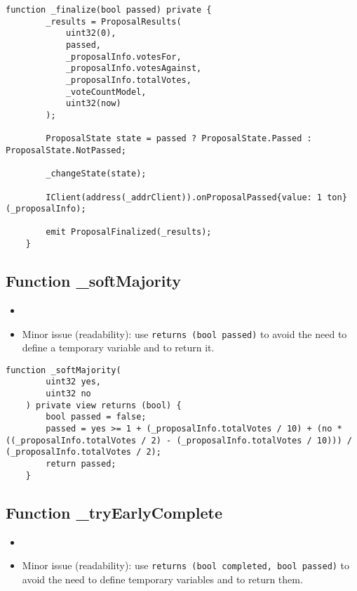 \begin{lstlisting}[firstnumber=81]
    function _finalize(bool passed) private {
        _results = ProposalResults(
            uint32(0),
            passed,
            _proposalInfo.votesFor,
            _proposalInfo.votesAgainst,
            _proposalInfo.totalVotes,
            _voteCountModel,
            uint32(now)
        );

        ProposalState state = passed ? ProposalState.Passed : ProposalState.NotPassed;

        _changeState(state);

        IClient(address(_addrClient)).onProposalPassed{value: 1 ton} (_proposalInfo);

        emit ProposalFinalized(_results);
    }
\end{lstlisting}

\subsection{Function \_{}softMajority}

\begin{itemize}
\item {}
\item Minor issue (readability): use {\tt returns (bool passed)} to
  avoid the need to define a temporary variable and to return it.
\end{itemize}

\begin{lstlisting}[firstnumber=141]
    function _softMajority(
        uint32 yes,
        uint32 no
    ) private view returns (bool) {
        bool passed = false;
        passed = yes >= 1 + (_proposalInfo.totalVotes / 10) + (no * ((_proposalInfo.totalVotes / 2) - (_proposalInfo.totalVotes / 10))) / (_proposalInfo.totalVotes / 2);
        return passed;
    }
\end{lstlisting}

\subsection{Function \_{}tryEarlyComplete}

\begin{itemize}
\item {}
\item Minor issue (readability): use {\tt returns (bool completed,
  bool passed)} to avoid the need to define temporary variables and to
  return them.
\end{itemize}

